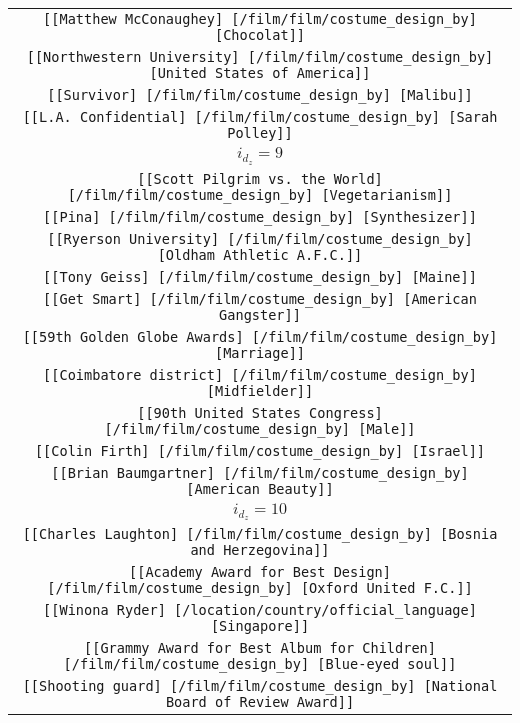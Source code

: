 \begin{longtable}{|c|}
    \texttt{[[Matthew McConaughey] [/film/film/costume\_design\_by] [Chocolat]]}\\
    \texttt{[[Northwestern University] [/film/film/costume\_design\_by] [United States of America]]}\\
    \texttt{[[Survivor] [/film/film/costume\_design\_by] [Malibu]]}\\
    \texttt{[[L.A. Confidential] [/film/film/costume\_design\_by] [Sarah Polley]]}\\ \hline
    \rowcolor[HTML]{EFEFEF} 
    \textsc{$i_{d_z}=9$}\\ \hline
    \texttt{[[Scott Pilgrim vs. the World] [/film/film/costume\_design\_by] [Vegetarianism]]}\\
    \texttt{[[Pina] [/film/film/costume\_design\_by] [Synthesizer]]}\\
    \texttt{[[Ryerson University] [/film/film/costume\_design\_by] [Oldham Athletic A.F.C.]]}\\
    \texttt{[[Tony Geiss] [/film/film/costume\_design\_by] [Maine]]}\\
    \texttt{[[Get Smart] [/film/film/costume\_design\_by] [American Gangster]]}\\
    \texttt{[[59th Golden Globe Awards] [/film/film/costume\_design\_by] [Marriage]]}\\
    \texttt{[[Coimbatore district] [/film/film/costume\_design\_by] [Midfielder]]}\\
    \texttt{[[90th United States Congress] [/film/film/costume\_design\_by] [Male]]}\\
    \texttt{[[Colin Firth] [/film/film/costume\_design\_by] [Israel]]}\\
    \texttt{[[Brian Baumgartner] [/film/film/costume\_design\_by] [American Beauty]]}\\ \hline
    \rowcolor[HTML]{EFEFEF} 
    \textsc{$i_{d_z}=10$}\\ \hline
    \texttt{[[Charles Laughton] [/film/film/costume\_design\_by] [Bosnia and Herzegovina]]}\\
    \texttt{[[Academy Award for Best Design] [/film/film/costume\_design\_by] [Oxford United F.C.]]}\\
    \texttt{[[Winona Ryder] [/location/country/official\_language] [Singapore]]}\\
    \texttt{[[Grammy Award for Best Album for Children] [/film/film/costume\_design\_by] [Blue-eyed soul]]}\\
    \texttt{[[Shooting guard] [/film/film/costume\_design\_by] [National Board of Review Award]]}\\

\end{longtable}
